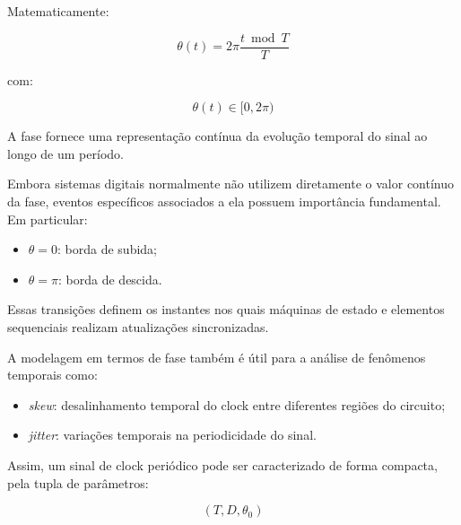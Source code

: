 Matematicamente:

\[
\theta(t) = 2\pi \frac{t \bmod T}{T}
\]

com:

\[
\theta(t) \in [0, 2\pi)
\]

A fase fornece uma representação contínua da evolução temporal do sinal ao longo de um período.

Embora sistemas digitais normalmente não utilizem diretamente o valor contínuo da fase, eventos específicos associados a ela possuem importância fundamental. Em particular:

\begin{itemize}
    \item \(\theta = 0\): borda de subida;
    \item \(\theta = \pi\): borda de descida.
\end{itemize}

Essas transições definem os instantes nos quais máquinas de estado e elementos sequenciais realizam atualizações sincronizadas.

A modelagem em termos de fase também é útil para a análise de fenômenos temporais como:

\begin{itemize}
    \item \textit{skew}: desalinhamento temporal do clock entre diferentes regiões do circuito;
    \item \textit{jitter}: variações temporais na periodicidade do sinal.
\end{itemize}

Assim, um sinal de clock periódico pode ser caracterizado de forma compacta, pela tupla de parâmetros:

\[
(T, D, \theta_0)
\]